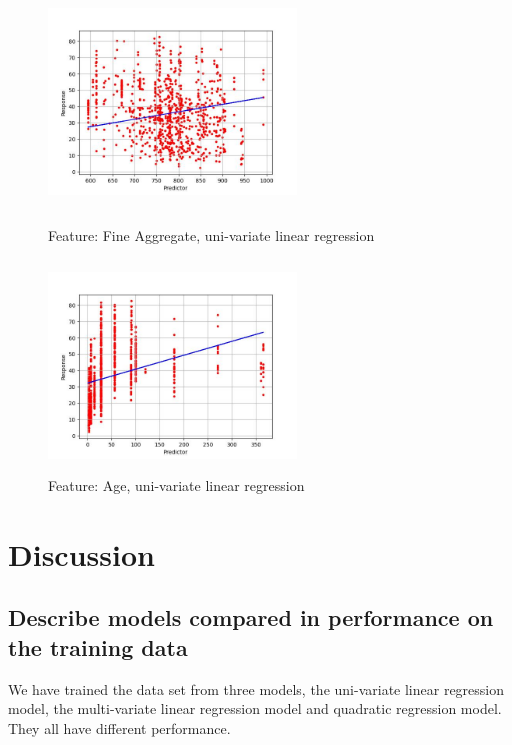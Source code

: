 \documentclass{article}
\begin{document}
\begin{figure}[!h]
    \centering
    \begin{minipage}[t]{0.49\textwidth}
        \centering
        \includegraphics[height = 5.6cm, width=6.6cm]{images/6.jpg}
        \caption{Feature: Fine Aggregate, uni-variate linear regression}
        \label{fig:6}
    \end{minipage}
    \begin{minipage}[t]{0.49\textwidth}
        \centering
        \includegraphics[height = 5.6cm, width=6.6cm]{images/7.jpg}
        \caption{Feature: Age, uni-variate linear regression}
        \label{fig:7}
    \end{minipage}
\end{figure}







\section{Discussion}

\subsection{Describe models compared in performance on the training data}
We have trained the data set from three models, the uni-variate linear regression model, the multi-variate linear regression model and quadratic regression model. They all have different performance.
\end{document}
